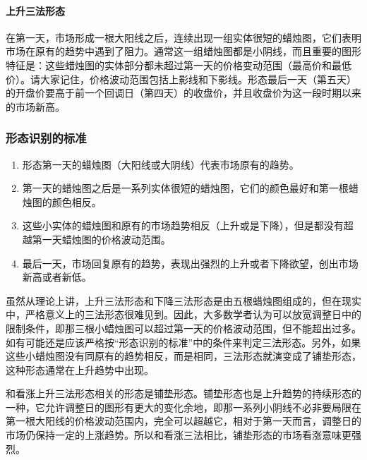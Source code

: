 \paragraph{上升三法形态} 在第一天，市场形成一根大阳线之后，连续出现一组实体很短的蜡烛图，它们表明市场在原有的趋势中遇到了阻力。通常这一组蜡烛图都是小阴线，而且重要的图形特征是：这些蜡烛图的实体部分都未超过第一天的价格变动范围（最高价和最低价）。请大家记住，价格波动范围包括上影线和下影线。形态最后一天（第五天）的开盘价要高于前一个回调日（第四天）的收盘价，并且收盘价为这一段时期以来的市场新高。


\subsubsection*{形态识别的标准}
\begin{enumerate}
    \item 形态第一天的蜡烛图（大阳线或大阴线）代表市场原有的趋势。
    \item 第一天的蜡烛图之后是一系列实体很短的蜡烛图，它们的颜色最好和第一根蜡烛图的颜色相反。
    \item 这些小实体的蜡烛图和原有的市场趋势相反（上升或是下降），但是都没有超越第一天蜡烛图的价格波动范围。
    \item 最后一天，市场回复原有的趋势，表现出强烈的上升或者下降欲望，创出市场新高或者新低。
\end{enumerate}

虽然从理论上讲，上升三法形态和下降三法形态是由五根蜡烛图组成的，但在现实中，严格意义上的三法形态很难见到。因此，大多数学者认为可以放宽调整日中的限制条件，即那三根小蜡烛图可以超过第一天的价格波动范围，但不能超出过多。如有可能还是应该严格按“形态识别的标准”中的条件来判定三法形态。另外，如果这些小蜡烛图没有同原有的趋势相反，而是相同，三法形态就演变成了铺垫形态，这种形态通常在上升趋势中出现。

和看涨上升三法形态相关的形态是铺垫形态。铺垫形态也是上升趋势的持续形态的一种，它允许调整日的图形有更大的变化余地，即那一系列小阴线不必非要局限在第一根大阳线的价格波动范围内，完全可以超越它，相对于第一天而言，调整日的市场仍保持一定的上涨趋势。所以和看涨三法相比，铺垫形态的市场看涨意味更强烈。
